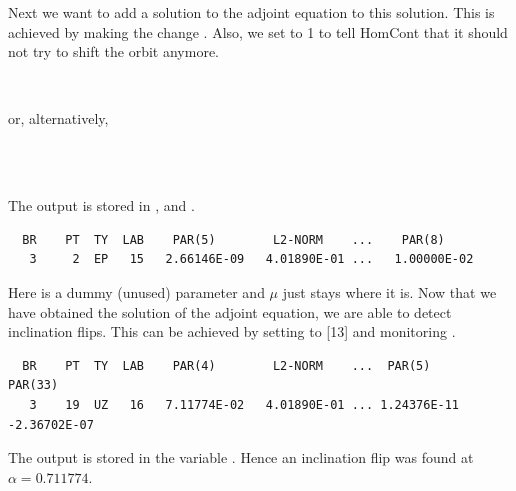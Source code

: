\documentclass[12pt]{report}
\begin{document}
Next we want to add a solution to the adjoint equation to this
solution. This is achieved by making the change .
Also, we set  to 1 to tell 
{\cal HomCont} that it should not try to shift the orbit anymore.
\begin{center}
 \\
\end{center}
or, alternatively,
\begin{center}
\\
\\
\end{center}
The output is stored in ,   and .
\begin{verbatim}
  BR    PT  TY  LAB    PAR(5)        L2-NORM    ...    PAR(8)     
   3     2  EP   15   2.66146E-09   4.01890E-01 ...   1.00000E-02
\end{verbatim}
Here  is a dummy (unused) parameter and $\mu$ just stays where
it is. Now that we have obtained the solution of the adjoint equation,
we are able to detect inclination flips. This can be achieved by
setting  to [13] and monitoring .
\begin{center}
\end{center} 
\begin{verbatim}
  BR    PT  TY  LAB    PAR(4)        L2-NORM    ...  PAR(5)        PAR(33)
   3    19  UZ   16   7.11774E-02   4.01890E-01 ... 1.24376E-11  -2.36702E-07
\end{verbatim}   
The output is stored in the \python variable .
Hence an inclination flip was found at $\alpha=0.711774$.
\end{document}
